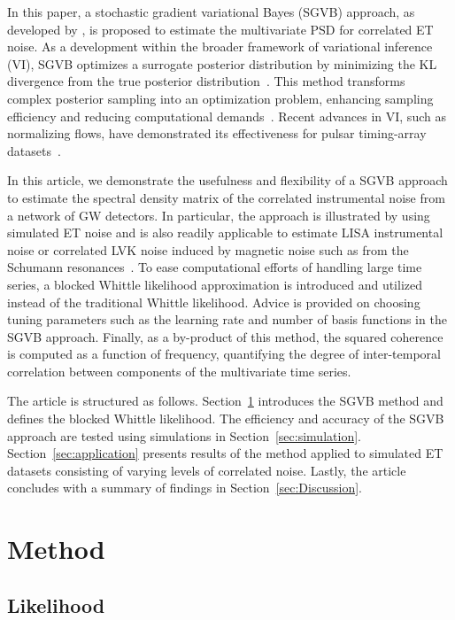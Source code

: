 \documentclass[%
 reprint,
 amsmath,amssymb,
 aps,
 nofootinbib,
]{revtex4-2}
\begin{document}
In this paper, a stochastic gradient variational Bayes (SGVB) approach, as developed by \citet{Hu2023}, is proposed to estimate the multivariate \ac{PSD} for correlated \ac{ET} noise. As a development within the broader framework of variational inference (VI), SGVB optimizes a surrogate posterior distribution by minimizing the \ac{KL} divergence from the true posterior distribution~\cite{Jordan1999,Wainwright2008,Blei2017}.
This method transforms complex posterior sampling into an optimization problem, enhancing sampling efficiency and reducing computational demands~\cite{Blei2006,kingma2022}.
Recent advances in VI, such as normalizing flows, have demonstrated its effectiveness for pulsar timing-array datasets~\cite{Vallisneri2024}.


In this article, we demonstrate the usefulness and flexibility of a SGVB approach to estimate the spectral density matrix of the correlated instrumental noise from a  network of \ac{GW} detectors.
In particular, the approach is illustrated by using simulated ET noise and is also readily applicable to estimate  \ac{LISA} instrumental noise or correlated \ac{LVK} noise induced by magnetic noise such as from the Schumann resonances~\cite{Thrane_correlations_SGWB}.
To ease computational efforts of handling large time series, a blocked Whittle likelihood approximation is introduced and utilized instead of the traditional Whittle likelihood.
Advice is provided on choosing tuning parameters such as the learning rate and number of basis functions in the SGVB approach.
Finally, as a by-product of this method, the squared coherence is computed  as a function of frequency, quantifying the degree of inter-temporal correlation between components of the multivariate time series.

The article is structured as follows.
Section~\ref{sec:method} introduces the \ac{SGVB} method and defines the blocked Whittle likelihood.
The efficiency and accuracy of the SGVB approach are tested using simulations in Section~\ref{sec:simulation}.
Section~\ref{sec:application} presents results of the method applied to simulated \ac{ET} datasets consisting of varying levels of correlated noise.
Lastly, the article concludes with a summary of findings in Section~\ref{sec:Discussion}.

\section{Method}
\label{sec:method}

\subsection{Likelihood}
\end{document}
